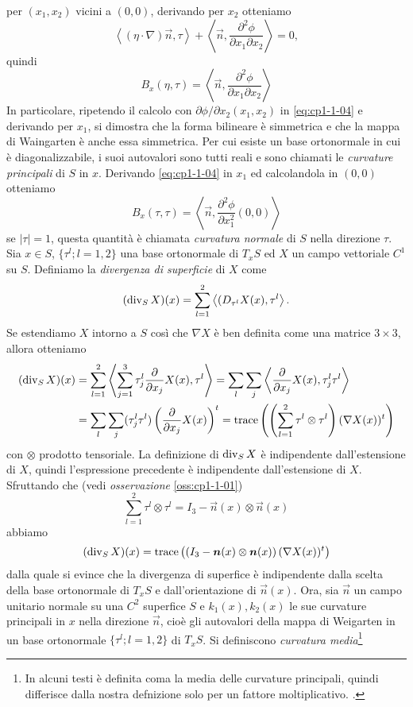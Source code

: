 per $(x_1,x_2)$ vicini a $(0,0)$, derivando per $x_2$  otteniamo
\[
\left<(\eta\cdot\nabla)\vec{n},\tau\right>+\left<\vec{n},\frac{\partial^2\phi}{\partial x_1\partial x_2}\right> = 0,
\]
quindi
\[
B_x(\eta,\tau)=\left<\vec{n},\frac{\partial^2\phi}{\partial x_1\partial x_2}\right>
\]
In particolare, ripetendo il calcolo con $\partial\phi/\partial x_2(x_1,x_2)$ in \eqref{eq:cp1-1-04} e derivando per $x_1$, si dimostra che la forma bilineare è simmetrica e che la mappa di Waingarten è anche essa simmetrica. Per cui esiste un base ortonormale in cui è diagonalizzabile, i suoi autovalori sono tutti reali e sono chiamati le \emph{curvature principali} di $S$ in $x$. Derivando \eqref{eq:cp1-1-04} in $x_1$ ed calcolandola in $(0,0)$ otteniamo
\[
B_x(\tau,\tau)=\left<\vec{n},\frac{\partial^2\phi}{\partial x_1^2}(0,0)\right>
\]
se $|\tau|=1$, questa quantità è chiamata \emph{curvatura normale} di $S$ nella direzione $\tau$. Sia $x\in S$, $\{\tau^l;l=1,2\}$ una base ortonormale di $T_xS$ ed  $X$ un campo vettoriale $C^1$ su $S$. Definiamo la \emph{divergenza di superficie} di $X$ come
\[
(\operatorname{div}_S X)(x) = \sum_{l=1}^2\left<(D_{\tau^l}X(x),\tau^l\right>.
\]
Se estendiamo $X$ intorno a $S$ così che $\nabla X$ è ben definita come una matrice $3\times 3$, allora otteniamo
\[
\begin{aligned}
(\operatorname{div}_S X)(x)&=\sum_{l=1}^2\left<\sum_{j=1}^3\tau_j^l\frac{\partial}{\partial x_j}X(x),\tau^l\right> =\sum_{l}\sum_{j}\left<\frac{\partial}{\partial x_j}X(x),\tau_j^l\tau^l\right> \\
&=\sum_{l}\sum_{j}(\tau_j^l\tau^l)\left(\frac{\partial}{\partial x_j}X(x)\right)^t=\operatorname{trace}\left(\left(\sum_{l=1}^2\tau^l\otimes\tau^l\right) (\nabla X(x))^t\right)
\end{aligned}
\]
con $\otimes$ prodotto tensoriale. La definizione di $\operatorname{div}_S X$ è indipendente dall'estensione di $X$, quindi l'espressione precedente è indipendente dall'estensione di $X$. Sfruttando che (vedi \emph{osservazione} \ref{oss:cp1-1-01})
\begin{equation}
\label{eq:cp1-1-05}
\sum_{l=1}^2\tau^l\otimes\tau^l = I_3 - \vec{n}(x)\otimes\vec{n}(x)
\end{equation}
abbiamo
\begin{equation}
(\operatorname{div}_S X)(x)=\operatorname{trace}\left(\left(I_3 - \bm{n}(x)\otimes\bm{n}(x)\right) (\nabla X(x))^t\right)
\end{equation}
dalla quale si evince che la divergenza di superfice è indipendente dalla scelta della base ortonormale di $T_xS$ e dall'orientazione di $\vec{n}(x)$.
Ora, sia $\vec{n}$ un campo unitario normale su una $C^2$ superfice $S$ e $k_1(x),k_2(x)$ le sue curvature principali in $x$ nella direzione $\vec{n}$, cioè gli autovalori della mappa di Weigarten in un base ortonormale $\{\tau^l;l=1,2\}$ di $T_xS$. Si definiscono \emph{curvatura media}\footnote{In alcuni testi è definita coma la media delle curvature principali, quindi differisce dalla nostra defnizione solo per un fattore moltiplicativo. \cite[][]{giga:main}.} \,%
